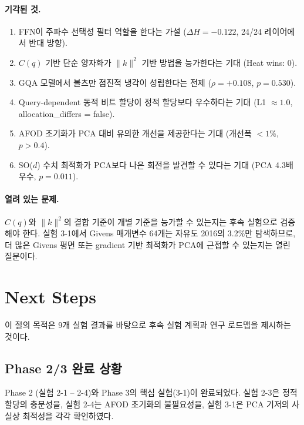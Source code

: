 \documentclass[11pt,a4paper]{article}
\begin{document}
\paragraph{기각된 것.}
\begin{enumerate}[nosep]
  \item FFN이 주파수 선택성 필터 역할을 한다는 가설 ($\Delta H = -0.122$, 24/24 레이어에서 반대 방향).
  \item $C(q)$ 기반 단순 양자화가 $\|k\|^2$ 기반 방법을 능가한다는 기대 (Heat wins: 0).
  \item GQA 모델에서 볼츠만 점진적 냉각이 성립한다는 전제 ($\rho = +0.108$, $p = 0.530$).
  \item Query-dependent 동적 비트 할당이 정적 할당보다 우수하다는 기대 (L1 $\approx 1.0$, allocation\_differs = false).
  \item AFOD 초기화가 PCA 대비 유의한 개선을 제공한다는 기대 (개선폭 $< 1\%$, $p > 0.4$).
  \item SO($d$) 수치 최적화가 PCA보다 나은 회전을 발견할 수 있다는 기대 (PCA 4.3배 우수, $p = 0.011$).
\end{enumerate}

\paragraph{열려 있는 문제.}
$C(q)$와 $\|k\|^2$의 결합 기준이 개별 기준을 능가할 수 있는지는 후속 실험으로 검증해야 한다.
실험 3-1에서 Givens 매개변수 64개는 자유도 2016의 3.2\%만 탐색하므로, 더 많은 Givens 평면 또는 gradient 기반 최적화가 PCA에 근접할 수 있는지는 열린 질문이다.

\section{Next Steps}

이 절의 목적은 9개 실험 결과를 바탕으로 후속 실험 계획과 연구 로드맵을 제시하는 것이다.

\subsection{Phase 2/3 완료 상황}

Phase 2 (실험 2-1 -- 2-4)와 Phase 3의 핵심 실험(3-1)이 완료되었다.
실험 2-3은 정적 할당의 충분성을, 실험 2-4는 AFOD 초기화의 불필요성을, 실험 3-1은 PCA 기저의 사실상 최적성을 각각 확인하였다.
\end{document}
